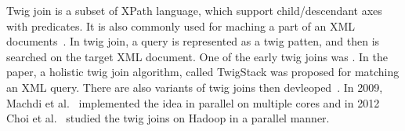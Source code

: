 Twig join is a subset of XPath language, which support child/descendant axes 
with predicates. It is also commonly used for maching a part of an XML
documents~\cite{jiang2003holistic,lu2005efficient,lu2005tjfast,
	fontoura2005optimizing}. In twig join, a query is represented as a twig patten,
and then is searched on the target XML document. One of the early twig joins was
\cite{BrKS02}. In the paper, a holistic twig join algorithm, called TwigStack
was proposed for matching an XML query. There are also variants of twig joins
then devleoped~\cite{CLTH06,QiYD07}. In 2009, Machdi et al.~\cite{MaAK09}
implemented the idea in parallel on multiple cores and in 2012 Choi et
al.~\cite{CLKL12} studied the twig joins on Hadoop in a parallel manner.
